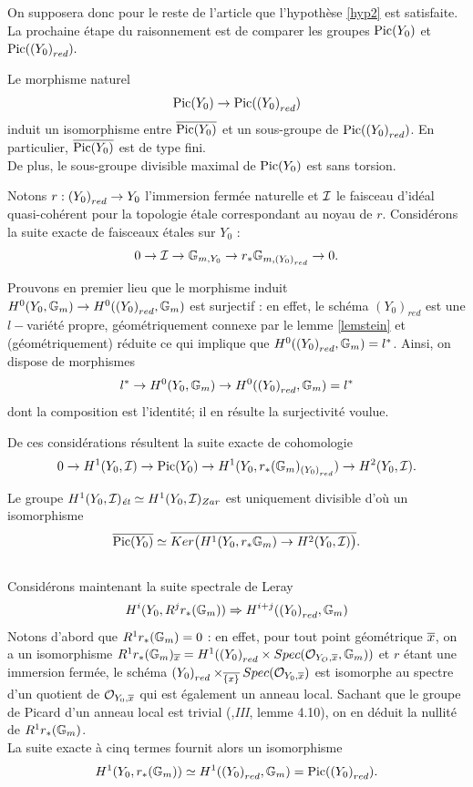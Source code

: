 \documentclass[11pt]{article}
\begin{document}
On supposera donc pour le reste de l'article que l'hypothèse \ref{hyp2} est satisfaite. La prochaine étape du raisonnement est de comparer les groupes $\operatorname{Pic}(Y_0)$ et $\operatorname{Pic}({(Y_0)}_{red}).$

\begin{lemme}\label{Picred}
Le morphisme naturel
    $$\operatorname{Pic}(Y_0) \rightarrow \operatorname{Pic}({(Y_0)}_{red}) $$ induit un isomorphisme entre $\overline{\operatorname{Pic}(Y_0)}$ et un sous-groupe de $\operatorname{Pic}({{(Y_0)}_{red}})$. En particulier, $\overline{\operatorname{Pic}(Y_0)}$ est de type fini.\\
    De plus, le sous-groupe divisible maximal de $\operatorname{Pic}(Y_0)$ est sans torsion.
\end{lemme}

\proof Notons $r : {(Y_0)}_{red} \rightarrow Y_0$ l'immersion fermée naturelle et $\mathcal{I}$ le faisceau d'idéal quasi-cohérent pour la topologie étale correspondant au noyau de $r$.
Considérons la suite exacte de faisceaux étales sur $Y_0$ :
$$  0 \rightarrow \mathcal{I} \rightarrow \mathbb{G}_{m,{Y_0}} \rightarrow r_*\mathbb{G}_{m,{(Y_0)}_{red}} \rightarrow 0 .$$

Prouvons en premier lieu que le morphisme induit $H^0(Y_0, \mathbb{G}_{m}) \rightarrow H^0({(Y_0)}_{red}, \mathbb{G}_{m}) $ est surjectif : en effet, le schéma ${(Y_0)}_{red}$ est une $l-$variété propre, géométriquement connexe par le lemme \ref{lemstein} et (géométriquement) réduite ce qui implique que $H^0({(Y_0)}_{red}, \mathbb{G}_{m}) = l^*$. Ainsi, on dispose de morphismes 
$$
l^* \rightarrow H^0(Y_0, \mathbb{G}_{m}) \rightarrow H^0({(Y_0)}_{red}, \mathbb{G}_{m}) = l^*
$$
dont la composition est l'identité; il en résulte la surjectivité voulue.


De ces considérations résultent la suite exacte de cohomologie 
$$
 0 \rightarrow  H^1(Y_0,\mathcal{I}) \rightarrow \operatorname{Pic}(Y_0) \rightarrow H^1(Y_0, {r}_*(\mathbb{G}_m)_{{(Y_0)}_{red}}) \rightarrow H^2(Y_0,\mathcal{I}) .
$$

Le groupe $H^1(Y_0,\mathcal{I})_{\textit{\'et}} \simeq H^1(Y_0,\mathcal{I})_{Zar}$ est uniquement divisible d'où un isomorphisme $$\overline{\operatorname{Pic}(Y_0)} \simeq  \overline{Ker\big({H^1(Y_0, {r}_*\mathbb{G}_{m})} \rightarrow H^2(Y_0,\mathcal{I}) \big)}.$$ \\
Considérons maintenant la suite spectrale de Leray
$$
H^i(Y_0, R^j{r}_*(\mathbb{G}_m)) \Rightarrow H^{i+j}({(Y_0)}_{red}, \mathbb{G}_m)
$$
Notons d'abord que $R^1{r}_*(\mathbb{G}_m)=0$ : en effet, pour tout point géométrique $\overline{x}$, on a un isomorphisme $R^1{r}_*(\mathbb{G}_m)_{\overline{x}} = H^1({(Y_0)}_{red} \times Spec(\mathcal{O}_{Y_O,\overline{x}}, \mathbb{G}_m))$ et $r$ étant une immersion fermée, le schéma ${(Y_0)}_{red} \times_{\overline{\{x\}}} Spec(\mathcal{O}_{Y_0,\overline{x}})$ est isomorphe au spectre d'un quotient de $\mathcal{O}_{Y_0,\overline{x}}$ qui est également un anneau local. Sachant que le groupe de Picard d'un anneau local est trivial (\cite{Milne},\textit{III}, lemme 4.10), on en déduit la nullité de $R^1{r}_*(\mathbb{G}_m)$.\\
La suite exacte à cinq termes fournit alors un isomorphisme
$$H^1(Y_0, r_*(\mathbb{G}_m)) \simeq H^1({(Y_0)}_{red}, \mathbb{G}_m) = \operatorname{Pic}({(Y_0)}_{red}).$$
\end{document}
